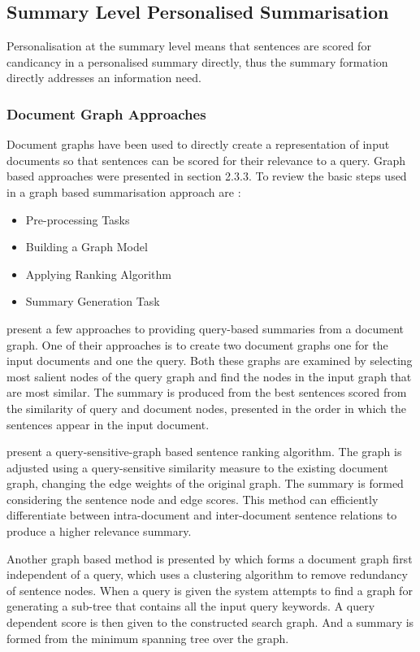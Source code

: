 \subsection{Summary Level Personalised Summarisation}
\label{subsec:2.4.1}
Personalisation at the summary level means that sentences are scored for candicancy in a personalised summary directly, thus the summary formation directly addresses an information need. 

\subsubsection{Document Graph Approaches}
Document graphs have been used to directly create a representation of input documents so that sentences can be scored for their relevance to a query. Graph based approaches were presented in section 2.3.3. To review the basic steps used in a graph based summarisation approach are \citep{rahman2015survey}:

\begin{itemize}
      \item Pre-processing Tasks
      \item Building a Graph Model
      \item Applying Ranking Algorithm
      \item Summary Generation Task
\end{itemize}

\citet{mohamed2006improving} present a few approaches to providing query-based summaries from a document graph. One of their approaches is to create two document graphs one for the input documents and one the query. Both these graphs are examined by selecting most salient nodes of the query graph and find the nodes in the input graph that are most similar. The summary is produced from the best sentences scored from the similarity of query and document nodes, presented in the order in which the sentences appear in the input document.

\citet{wei2008query} present a query-sensitive-graph based sentence ranking algorithm. The graph is adjusted using a query-sensitive similarity measure to the existing document graph, changing the edge weights of the original graph. The summary is formed considering the sentence node and edge scores. This method can efficiently differentiate between intra-document and inter-document sentence relations to produce a higher relevance summary. 

Another graph based method is presented by \citet{pandit2013query} which forms a document graph first independent of a query, which uses a clustering algorithm to remove redundancy of sentence nodes. When a query is given the system attempts to find a graph for generating a sub-tree that contains all the input query keywords. A query dependent score is then given to the constructed search graph. And a summary is formed from the minimum spanning tree over the graph.


